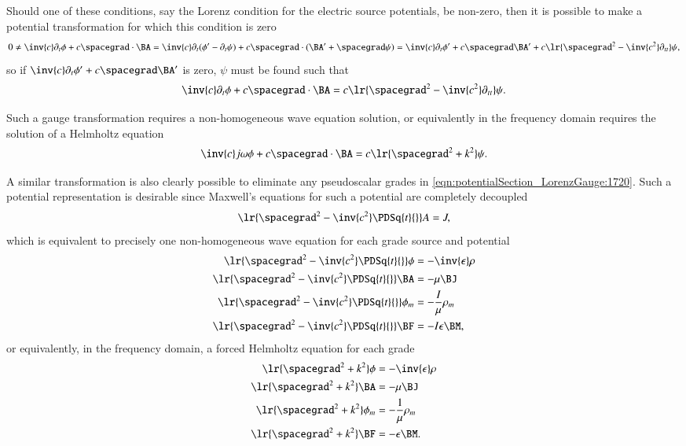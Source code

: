 Should one of these conditions, say the Lorenz condition for the electric source potentials, be non-zero, then it is possible to make a potential transformation for which this condition is zero
\begin{dmath}\label{eqn:potentialSection_LorenzGauge:1680}
0 \ne
\inv{c} \partial_t \phi + c \spacegrad \cdot \BA
=
\inv{c} \partial_t (\phi' - \partial_t \psi) + c \spacegrad \cdot (\BA' + \spacegrad \psi)
=
\inv{c} \partial_t \phi' + c \spacegrad \BA'
+ c \lr{ \spacegrad^2 - \inv{c^2} \partial_{tt} } \psi,
\end{dmath}
so if \( \inv{c} \partial_t \phi' + c \spacegrad \BA' \) is zero, \( \psi \) must be found such that
\begin{dmath}\label{eqn:potentialSection_LorenzGauge:1700}
\inv{c} \partial_t \phi + c \spacegrad \cdot \BA
= c \lr{ \spacegrad^2 - \inv{c^2} \partial_{tt} } \psi.
\end{dmath}

Such a gauge transformation requires a non-homogeneous wave equation solution, or equivalently in the frequency domain requires the solution of a Helmholtz equation
\begin{dmath}\label{eqn:potentialSection_LorenzGauge:1740}
\inv{c} j \omega \phi + c \spacegrad \cdot \BA
= c \lr{ \spacegrad^2 + k^2 } \psi.
\end{dmath}

A similar transformation is also clearly possible to eliminate any pseudoscalar grades in \cref{eqn:potentialSection_LorenzGauge:1720}.
Such a potential representation is desirable since
Maxwell's equations for such a potential are completely decoupled
\begin{dmath}\label{eqn:potentialSection_LorenzGauge:1760}
\lr{ \spacegrad^2 - \inv{c^2} \PDSq{t}{} } A = J,
\end{dmath}
which is equivalent to precisely one non-homogeneous wave equation for each grade source and potential
\begin{dmath}\label{eqn:potentialSection_LorenzGauge:1600}
\begin{aligned}
\lr{ \spacegrad^2 - \inv{c^2} \PDSq{t}{} } \phi &= - \inv{\epsilon} \rho \\
\lr{ \spacegrad^2 - \inv{c^2} \PDSq{t}{} } \BA &= - \mu \BJ \\
\lr{ \spacegrad^2 - \inv{c^2} \PDSq{t}{} } \phi_m &= - \frac{I}{\mu} \rho_m \\
\lr{ \spacegrad^2 - \inv{c^2} \PDSq{t}{} } \BF &= - I \epsilon \BM,
\end{aligned}
\end{dmath}
or equivalently, in the frequency domain, a forced Helmholtz equation for each grade
\begin{dmath}\label{eqn:potentialSection_LorenzGauge:1780}
\begin{aligned}
\lr{ \spacegrad^2 + k^2 } \phi &= - \inv{\epsilon} \rho \\
\lr{ \spacegrad^2 + k^2 } \BA &= - \mu \BJ \\
\lr{ \spacegrad^2 + k^2 } \phi_m &= - \frac{1}{\mu} \rho_m \\
\lr{ \spacegrad^2 + k^2 } \BF &= - \epsilon \BM.
\end{aligned}
\end{dmath}
